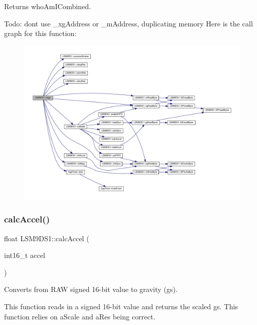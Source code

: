 \begin{DoxyReturn}{Returns}
who\+Am\+I\+Combined. 
\end{DoxyReturn}
Todo\+: don\textquotesingle{}t use \+\_\+xg\+Address or \+\_\+m\+Address, duplicating memory Here is the call graph for this function\+:
\nopagebreak
\begin{figure}[H]
\begin{center}
\leavevmode
\includegraphics[width=350pt]{classLSM9DS1_a8728e560c76bd120b3711af15a6ecbd6_cgraph}
\end{center}
\end{figure}
\mbox{\label{classLSM9DS1_a54e2a7888b67b47cf0dd986c5b91a3c5}} 
\subsubsection{\texorpdfstring{calc\+Accel()}{calcAccel()}}
{\footnotesize\ttfamily float L\+S\+M9\+D\+S1\+::calc\+Accel (\begin{DoxyParamCaption}\item[{int16\+\_\+t}]{accel }\end{DoxyParamCaption})}



Converts from R\+AW signed 16-\/bit value to gravity (g\textquotesingle{}s). 

This function reads in a signed 16-\/bit value and returns the scaled g\textquotesingle{}s. This function relies on a\+Scale and a\+Res being correct.


